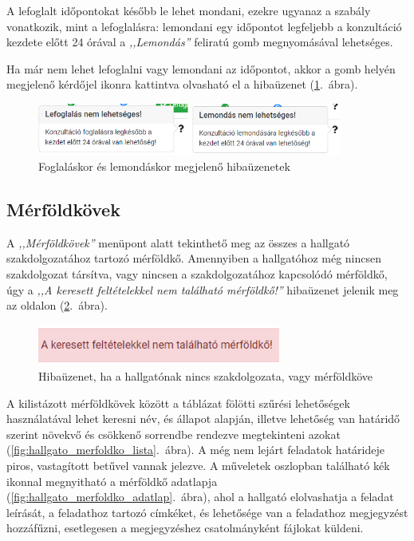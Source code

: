 \documentclass[
]{thesis-ekf}
\theoremstyle{definition}
\theoremstyle{remark}
\begin{document}
	A lefoglalt időpontokat később le lehet mondani, ezekre ugyanaz a szabály vonatkozik, mint a lefoglalásra: lemondani egy időpontot legfeljebb a konzultáció kezdete előtt 24 órával a \emph{,,Lemondás''} feliratú gomb megnyomásával lehetséges.
	
	Ha már nem lehet lefoglalni vagy lemondani az időpontot, akkor a gomb helyén megjelenő kérdőjel ikonra kattintva olvasható el a hibaüzenet (\ref{fig:hallgato_konzultacio_foglal_lemond_hibak}.~ábra).
	
	\begin{figure}[!h]
		\centering
		\includegraphics[width=10cm]{kepek/screenshots/hallgato_konzultacio_foglal_lemond_hibak.png}
		\caption{Foglaláskor és lemondáskor megjelenő hibaüzenetek}
		\label{fig:hallgato_konzultacio_foglal_lemond_hibak}
	\end{figure}
	
	\subsection{Mérföldkövek}
	A \emph{,,Mérföldkövek''} menüpont alatt tekinthető meg az összes a hallgató szakdolgozatához tartozó mérföldkő. Amennyiben a hallgatóhoz még nincsen szakdolgozat társítva, vagy nincsen a szakdolgozatához kapcsolódó mérföldkő, úgy a \emph{,,A keresett feltételekkel nem található mérföldkő!''} hibaüzenet jelenik meg az oldalon (\ref{fig:hallgato_merfoldko_nincs}.~ábra).
	
	\begin{figure}[!h]
		\centering
		\includegraphics[width=8cm]{kepek/screenshots/hallgato_merfoldko_nincs.png}
		\caption{Hibaüzenet, ha a hallgatónak nincs szakdolgozata, vagy mérföldköve}
		\label{fig:hallgato_merfoldko_nincs}
	\end{figure}
	
	A kilistázott mérföldkövek között a táblázat fölötti szűrési lehetőségek használatával lehet keresni név, és állapot alapján, illetve lehetőség van határidő szerint növekvő és csökkenő sorrendbe rendezve megtekinteni azokat (\ref{fig:hallgato_merfoldko_lista}.~ábra). A még nem lejárt feladatok határideje piros, vastagított betűvel vannak jelezve. A műveletek oszlopban található kék ikonnal megnyitható a mérföldkő adatlapja (\ref{fig:hallgato_merfoldko_adatlap}.~ábra), ahol a hallgató elolvashatja a feladat leírását, a feladathoz tartozó címkéket, és lehetősége van a feladathoz megjegyzést hozzáfűzni, esetlegesen a megjegyzéshez csatolmányként fájlokat küldeni.
	
\end{document}
